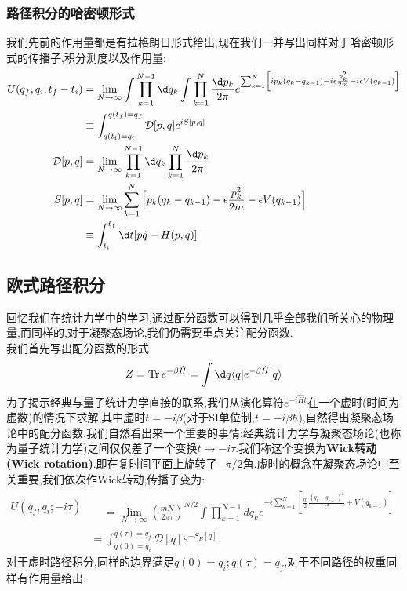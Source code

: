 \subsubsection{路径积分的哈密顿形式}
我们先前的作用量都是有拉格朗日形式给出,现在我们一并写出同样对于哈密顿形式的传播子,积分测度以及作用量:
\begin{equation}
    \begin{aligned}
        U(q_f,q_i;t_f-t_i)&=\lim_{N\to\infty}\int\prod_{k=1}^{N-1}\d q_{k}\int\prod_{k=1}^{N}\frac{\d p_{k}}{2\pi}e^{\sum_{k=1}^{N}\left[ip_{k}(q_{k}-q_{k-1})-i\epsilon\frac{p_{k}^{2}}{2m}-i\epsilon V(q_{k-1})\right]}\\
        &\equiv\int_{q(t_i)=q_i}^{q(t_f)=q_f}\mathcal{D}[p,q] e^{iS[p,q]} \\
        \mathcal{D}[p,q]&=\lim_{N\to\infty}\prod_{k=1}^{N-1}\d q_k\prod_{k=1}^N\frac{\d p_k}{2\pi}\\
        S[p,q]&=\lim_{N\to\infty}\sum_{k=1}^N\Big[p_k(q_k-q_{k-1})-\epsilon\frac{p_k^2}{2m}-\epsilon V(q_{k-1})\Big] \\
        &\equiv\int_{t_i}^{t_f}\dt [p\dot{q}-H(p,q)]
    \end{aligned}
\end{equation}








\subsection{欧式路径积分}
回忆我们在统计力学中的学习,通过配分函数可以得到几乎全部我们所关心的物理量,而同样的,对于凝聚态场论,我们仍需要重点关注配分函数.\\
我们首先写出配分函数的形式
\begin{equation}
    Z=\operatorname{Tr}e^{{-\beta\hat{H}}}=\int \d q\langle q|e^{{-\beta\hat{H}}}|q\rangle
\end{equation}
为了揭示经典与量子统计力学直接的联系,我们从演化算符$e^{-i\hat{H}t}$在一个虚时(时间为虚数)的情况下求解,其中虚时$t=-i\beta$(对于SI单位制,$t=-i\beta\hbar$),自然得出凝聚态场论中的配分函数.我们自然看出来一个重要的事情:经典统计力学与凝聚态场论(也称为量子统计力学)之间仅仅差了一个变换$t\to-i\tau$.我们称这个变换为\textbf{Wick转动(Wick rotation)}.即在复时间平面上旋转了$-\pi/2$角.虚时的概念在凝聚态场论中至关重要,我们依次作Wick转动,传播子变为:
\begin{equation}
    \begin{aligned}
        U(q_f,q_i;-i\tau)& \begin{aligned}&=\lim_{N\to\infty}\left(\frac{mN}{2\pi\tau}\right)^{N/2}\int\prod_{k=1}^{N-1}dq_k e^{-\epsilon\sum_{k=1}^N\left[\frac{m}{2}\frac{\left(q_k-q_{k-1}\right)^2}{\epsilon^2}+V\left(q_{k-1}\right)\right]}\end{aligned} \\
        &=\int_{q(0)=q_i}^{q(\tau)=q_f}\mathcal{D}[q] e^{-S_E[q]}.
    \end{aligned}
\end{equation}
对于虚时路径积分,同样的边界满足$q(0)=q_i;q(\tau)=q_f$,对于不同路径的权重同样有作用量给出:\\

